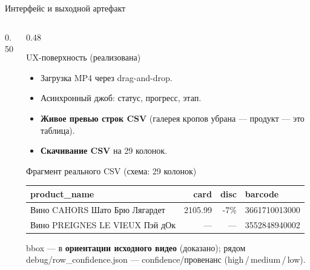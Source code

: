\documentclass[aspectratio=169,10pt]{beamer}
\newcommand{\code}[1]{{\ttfamily\small\color{slate}#1}}
\newcommand{\hl}[1]{{\bfseries\color{accent}#1}}
\begin{document}
\begin{frame}{Интерфейс и выходной артефакт}
\begin{columns}[T,onlytextwidth]
\begin{column}{0.50\textwidth}
    \end{column}
    \begin{column}{0.48\textwidth}
      \begin{block}{UX-поверхность (реализована)}\footnotesize
        \begin{itemize}\setlength\itemsep{1pt}
          \item Загрузка MP4 через drag-and-drop.
          \item Асинхронный джоб: статус, прогресс, этап.
          \item \hl{Живое превью строк CSV} (галерея кропов убрана — продукт — это таблица).
          \item \hl{Скачивание CSV} на 29 колонок.
        \end{itemize}
      \end{block}
      \vspace{0.3em}
      \begin{block}{Фрагмент реального CSV (схема: 29 колонок)}\scriptsize
        \setlength{\tabcolsep}{3pt}\renewcommand{\arraystretch}{1.05}
        \begin{tabular}{@{}p{2.55cm}rrl@{}}\toprule
          \tiny product\_name & \tiny card & \tiny disc & \tiny barcode\\ \midrule
          \tiny Вино CAHORS Шато Брю Лягардет     & \tiny 2105.99 & \tiny -7\% & \tiny 3661710013000\\
          \tiny Вино PREIGNES LE VIEUX Пэй дОк    & \tiny —       & \tiny —    & \tiny 3552848940002\\ \bottomrule
        \end{tabular}
        \vspace{0.2em}
        {\tiny\color{muted} bbox — в \hl{ориентации исходного видео} (доказано); рядом \code{debug/row\_confidence.json} — confidence/провенанс (high\,/\,medium\,/\,low).}
      \end{block}
    \end{column}
  \end{columns}
\end{frame}
\end{document}
